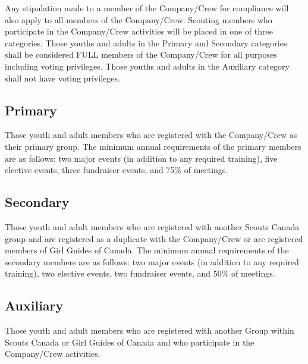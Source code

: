 Any stipulation made to a member of the Company/Crew for compliance will also apply to all members of the Company/Crew.
Scouting members who participate in the Company/Crew activities will be placed in one of three categories.
Those youths and adults in the Primary and Secondary categories shall be considered FULL members of the Company/Crew for all purposes including voting privileges.
Those youths and adults in the Auxiliary category shall not have voting privileges.

\subsection{Primary}\label{subsec:primary}
Those youth and adult members who are registered with the Company/Crew as their primary group.
The minimum annual requirements of the primary members are as follows: two major events (in addition to any required training), five elective events, three fundraiser events, and 75\% of meetings.

\subsection{Secondary}\label{subsec:secondary}
Those youth and adult members who are registered with another Scouts Canada group and are registered as a duplicate with the Company/Crew or are registered members of Girl Guides of Canada.
The minimum annual requirements of the secondary members are as follows: two major events (in addition to any required training), two elective events, two fundraiser events, and 50\% of meetings.

\subsection{Auxiliary}\label{subsec:auxiliary}
Those youth and adult members who are registered with another Group within Scouts Canada or Girl Guides of Canada and who participate in the Company/Crew activities.